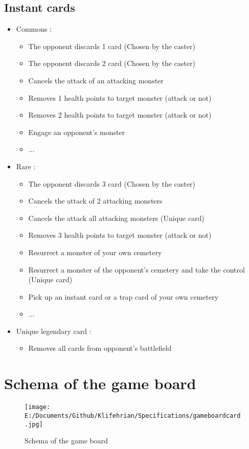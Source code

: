 \documentclass[a4paper,12pt]{book}
\begin{document}
\subsection{Instant cards}
\begin{itemize}
	\item Commons :
	\begin{itemize}
		\item The opponent discards 1 card (Chosen by the caster)
		\item The opponent discards 2 card (Chosen by the caster)
		\item Cancels the attack of an attacking monster
		\item Removes 1 health points to target monster (attack or not)
		\item Removes 2 health points to target monster (attack or not)
		\item Engage an opponent's monster
		\item ...
	\end{itemize}
	\item Rare :
	\begin{itemize}
		\item The opponent discards 3 card (Chosen by the caster)
		\item Cancels the attack of 2 attacking monsters
		\item Cancels the attack all attacking monsters (Unique card)
		\item Removes 3 health points to target monster (attack or not)
		\item Resurrect a monster of your own cemetery
		\item Resurrect a monster of the opponent's cemetery and take the control (Unique card)
		\item Pick up an instant card or a trap card of your own cemetery
		\item ...
	\end{itemize}
	\item Unique legendary card :
	\begin{itemize}
		\item Removes all cards from opponent's battlefield
	\end{itemize}
\end{itemize}
\newpage
\section{Schema of the game board}
\begin{figure}[h]
	\centering
		\texttt{[image: E:/Documents/Github/Klifehrian/Specifications/gameboardcard.jpg]}
	\caption{Schema of the game board}
	\label{fig:gameboardcard}
\end{figure}
\end{document}
